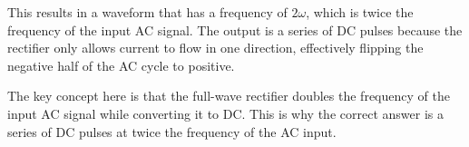 This results in a waveform that has a frequency of \( 2\omega \), which is twice the frequency of the input AC signal. The output is a series of DC pulses because the rectifier only allows current to flow in one direction, effectively flipping the negative half of the AC cycle to positive.

The key concept here is that the full-wave rectifier doubles the frequency of the input AC signal while converting it to DC. This is why the correct answer is a series of DC pulses at twice the frequency of the AC input.


